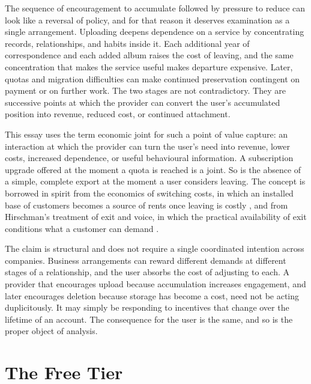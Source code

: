 \documentclass[12pt]{article}
\begin{document}
The sequence of encouragement to accumulate followed by pressure to reduce can look like a reversal of policy, and for that reason it deserves examination as a single arrangement. Uploading deepens dependence on a service by concentrating records, relationships, and habits inside it. Each additional year of correspondence and each added album raises the cost of leaving, and the same concentration that makes the service useful makes departure expensive. Later, quotas and migration difficulties can make continued preservation contingent on payment or on further work. The two stages are not contradictory. They are successive points at which the provider can convert the user's accumulated position into revenue, reduced cost, or continued attachment.

This essay uses the term economic joint for such a point of value capture: an interaction at which the provider can turn the user's need into revenue, lower costs, increased dependence, or useful behavioural information. A subscription upgrade offered at the moment a quota is reached is a joint. So is the absence of a simple, complete export at the moment a user considers leaving. The concept is borrowed in spirit from the economics of switching costs, in which an installed base of customers becomes a source of rents once leaving is costly \cite{shapiro1999}, and from Hirschman's treatment of exit and voice, in which the practical availability of exit conditions what a customer can demand \cite{hirschman1970}.

The claim is structural and does not require a single coordinated intention across companies. Business arrangements can reward different demands at different stages of a relationship, and the user absorbs the cost of adjusting to each. A provider that encourages upload because accumulation increases engagement, and later encourages deletion because storage has become a cost, need not be acting duplicitously. It may simply be responding to incentives that change over the lifetime of an account. The consequence for the user is the same, and so is the proper object of analysis.

\section{The Free Tier}
\end{document}
